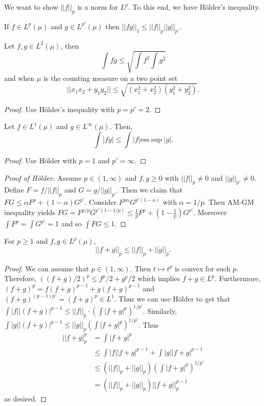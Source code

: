\documentclass{../uva7310}
\begin{document}
We want to show $||f||_p$ is a norm for $L^p$. To this end, we have H\"older's inequality.

\begin{thm}
    If $f\in L^p(\mu)$ and $g\in L^{p'}(\mu)$ then $||fg||_1\leq ||f||_p||g||_{p'}$.
\end{thm}

\begin{corollary}
    Let $f,g\in L^2(\mu)$, then
    \[
        \int fg \leq \sqrt{\int f^2\int g^2}
    \]
    and when $\mu$ is the counting measure on a two point set
    \[
        ||x_1x_2+y_1y_2||\leq \sqrt{(x_1^2+x_2^2)(y_1^2+y_2^2)}.
    \]
\end{corollary}
\begin{proof}
    Use H\"older's inequality with $p=p'=2$.
\end{proof}

\begin{corollary}
    Let $f\in L^1(\mu)$ and $g\in L^\infty(\mu)$. Then,
    \[
        \int |fg| \leq \int |f|\text{ess}\sup |g|.
    \]
\end{corollary}
\begin{proof}
    Use H\"older with $p=1$ and $p'=\infty$.
\end{proof}

\begin{proof}[Proof of H\"older]
    Assume $p\in(1,\infty)$ and $f,g\geq 0$ with $||f||_p\neq 0$ and $||g||_{p'}\neq 0$. Define $F=f/||f||_p$ and $G=g/||g||_{p'}$.
    Then we claim that $FG\leq \alpha F^p+(1-\alpha) G^{p'}$. Consider $F^{p\alpha}G^{p'(1-\alpha)}$ with $\alpha=1/p$. Then
    AM-GM inequality yields $FG=F^{p/p}G^{p'(1-1/p)}\leq \frac{1}{p}F^p+(1-\frac{1}{p}) G^{p'}$.
    Moreover $\int F^p=\int G^{p'}=1$ and so $\int FG\leq 1$.
\end{proof}

\begin{thm}
    For $p\geq 1$ and $f,g\in L^p(\mu)$,
    \[
        ||f+g||_p\leq ||f||_p+||g||_p.
    \]
\end{thm}

\begin{proof}
    We can assume that $p\in(1,\infty)$. Then $t\mapsto t^p$ is convex for such $p$. Therefore, $((f+g)/2)^p\leq f^p/2+g^p/2$
    which implies $f+g\in L^p$. Furthermore, $(f+g)^p=f(f+g)^{p-1}+g(f+g)^{p-1}$ and $(f+g)^{(p-1)p'}=(f+g)^p\in L^1$. Thus we can
    use H\"older to get that $\int |f||(f+g)|^{p-1}\leq ||f||_p \cdot \left(\int|f+g|^p\right)^{1/p'}$. Similarly,
    $\int|g||(f+g)|^{p-1}\leq ||g||_p\left(\int |f+g|^p\right)^{1/p'}$. Thus 
    \begin{align*}
        ||f+g|_p^p&=\int |f+g|^p\\
        &\leq \int |f||f+g|^{p-1} + \int |g||f+g|^{p-1}\\
        &\leq (||f||_p+||g||_p)\left(\int |f+g|^p\right)^{1/p'}\\
        &=(||f||_p+||g||_p)||f+g||_p^{p-1}
    \end{align*}
    as desired.
\end{proof}
\end{document}
